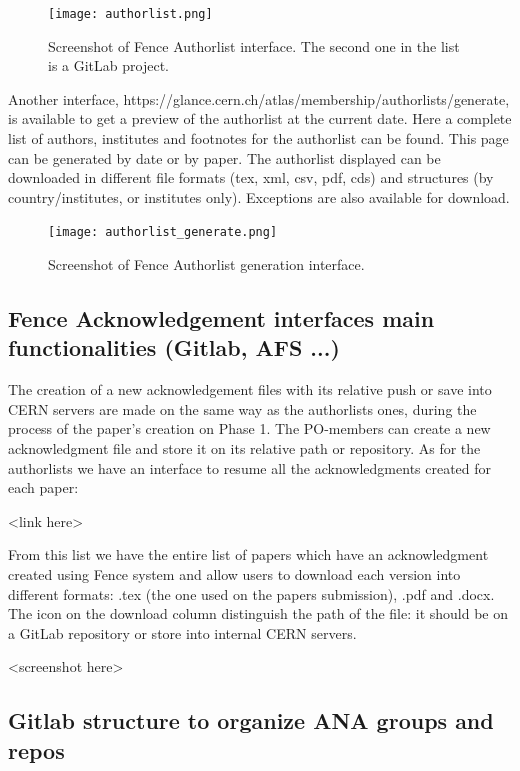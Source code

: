 \begin{figure}[ht!]
  \centering
  \texttt{[image: authorlist.png]}
  \caption{Screenshot of Fence Authorlist interface. The second one in the list is a GitLab project.}
  \label{fig:po-ana-tree}
\end{figure}

Another interface, https://glance.cern.ch/atlas/membership/authorlists/generate, is available to get a preview of the authorlist at the current date. Here a complete list of authors, institutes and footnotes for the authorlist can be found.
This page can be generated by date or by paper. The authorlist displayed can be downloaded in different file formats (tex, xml, csv, pdf, cds) and structures (by country/institutes, or institutes only). Exceptions are also available for download.

\begin{figure}[ht!]
  \centering
  \texttt{[image: authorlist\_generate.png]}
  \caption{Screenshot of Fence Authorlist generation interface.}
  \label{fig:po-ana-tree}
\end{figure}

\subsection{Fence Acknowledgement interfaces main functionalities (Gitlab, AFS ...)}

The creation of a new acknowledgement files with its relative push or save into CERN servers are made on the same way as the authorlists ones, during the process of the paper’s creation on Phase 1. The PO-members can create a new acknowledgment file and store it on its relative path or repository.
As for the authorlists we have an interface to resume all the acknowledgments created for each paper:
\centerline{<link here>}
From this list we have the entire list of papers which have an acknowledgment created using Fence system and allow users to download each version into different formats: .tex (the one used on the papers submission), .pdf and .docx. The icon on the download column distinguish the path of the file: it should be on a GitLab repository or store into internal CERN servers.

\centerline{<screenshot here>}

\subsection{Gitlab structure to organize ANA groups and repos}

